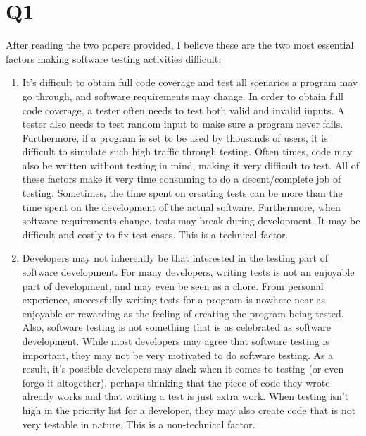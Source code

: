 \documentclass[12pt, letterpaper, titlepage]{article}
\begin{document}
 
\singlespacing

\section*{Q1}
After reading the two papers provided, I believe these are the two most essential factors making software testing activities difficult:
\begin{enumerate}
    \item It's difficult to obtain full code coverage and test all scenarios a program may go through, and software requirements may change. In order to obtain full code coverage, a tester often needs to test both valid and invalid inputs. A tester also needs to test random input to make sure a program never fails. Furthermore, if a program is set to be used by thousands of users, it is difficult to simulate such high traffic through testing. Often times, code may also be written without testing in mind, making it very difficult to test. All of these factors make it very time consuming to do a decent/complete job of testing. Sometimes, the time spent on creating tests can be more than the time spent on the development of the actual software. Furthermore, when software requirements change, tests may break during development. It may be difficult and costly to fix test cases. This is a technical factor.

    \item Developers may not inherently be that interested in the testing part of software development. For many developers, writing tests is not an enjoyable part of development, and may even be seen as a chore. From personal experience, successfully writing tests for a program is nowhere near as enjoyable or rewarding as the feeling of creating the program being tested. Also, software testing is not something that is as celebrated as software development. While most developers may agree that software testing is important, they may not be very motivated to do software testing. As a result, it's possible developers may slack when it comes to testing (or even forgo it altogether), perhaps thinking that the piece of code they wrote already works and that writing a test is just extra work. When testing isn't high in the priority list for a developer, they may also create code that is not very testable in nature. This is a non-technical factor.
\end{enumerate}
\end{document}
